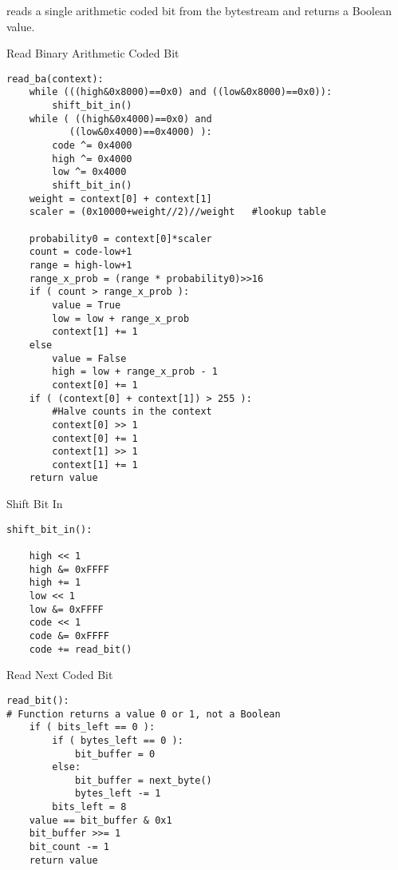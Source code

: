 \begin{comment}

This function is fundamental to all the arithmetic decoding functions.
It consists of three stages:

1.  Determine the binary output value VALUE as per Section 

2.  Modify the decoder state as per Section 

3.  Update the context statistics by invoking update( CONTEXT , VALUE )
as per Section 
\end{comment}



reads a single arithmetic coded bit from the bytestream and returns a
Boolean value.

Read Binary Arithmetic Coded Bit
\begin{verbatim}
read_ba(context):
    while (((high&0x8000)==0x0) and ((low&0x8000)==0x0)):
        shift_bit_in()
    while ( ((high&0x4000)==0x0) and
           ((low&0x4000)==0x4000) ):
        code ^= 0x4000
        high ^= 0x4000
        low ^= 0x4000
        shift_bit_in()
    weight = context[0] + context[1]
    scaler = (0x10000+weight//2)//weight   #lookup table

    probability0 = context[0]*scaler
    count = code-low+1
    range = high-low+1
    range_x_prob = (range * probability0)>>16
    if ( count > range_x_prob ):
        value = True
        low = low + range_x_prob
        context[1] += 1
    else
        value = False
        high = low + range_x_prob - 1
        context[0] += 1
    if ( (context[0] + context[1]) > 255 ):
        #Halve counts in the context
        context[0] >> 1
        context[0] += 1
        context[1] >> 1
        context[1] += 1
    return value
\end{verbatim}

Shift Bit In
\begin{verbatim}
shift_bit_in():

    high << 1
    high &= 0xFFFF
    high += 1
    low << 1
    low &= 0xFFFF
    code << 1
    code &= 0xFFFF
    code += read_bit()
\end{verbatim}

Read Next Coded Bit
\begin{verbatim}
read_bit():
# Function returns a value 0 or 1, not a Boolean
    if ( bits_left == 0 ):
        if ( bytes_left == 0 ):
            bit_buffer = 0
        else:
            bit_buffer = next_byte()
            bytes_left -= 1
        bits_left = 8
    value == bit_buffer & 0x1
    bit_buffer >>= 1
    bit_count -= 1
    return value
\end{verbatim}
